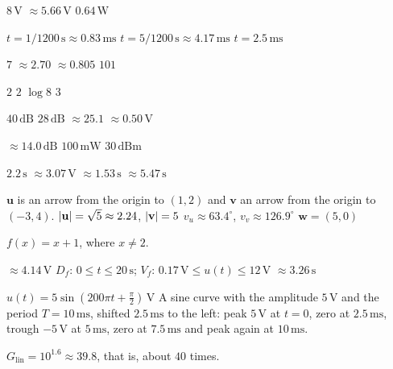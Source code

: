 \begin{facit}
  $8\,\text{V}$  $\approx 5.66\,\text{V}$  $0.64\,\text{W}$

  $t = 1/1200\,\text{s} \approx 0.83\,\text{ms}$
 $t = 5/1200\,\text{s} \approx 4.17\,\text{ms}$  $t = 2.5\,\text{ms}$

  $7$  $\approx 2.70$  $\approx 0.805$  $101$

  $2$  $2$  $\log 8$  $3$

  $40\,\text{dB}$  $28\,\text{dB}$  $\approx 25.1$
 $\approx 0.50\,\text{V}$

  $\approx 14.0\,\text{dB}$  $100\,\text{mW}$  $30\,\text{dBm}$

  $2.2\,\text{s}$  $\approx 3.07\,\text{V}$
 $\approx 1.53\,\text{s}$  $\approx 5.47\,\text{s}$

\end{facit}

\begin{facit}

  $\mathbf{u}$ is an arrow from the origin to $(1, 2)$ and $\mathbf{v}$ an arrow
from the origin to $(-3, 4)$.
 $\lvert\mathbf{u}\rvert = \sqrt{5} \approx 2.24$, $\lvert\mathbf{v}\rvert = 5$
 $v_u \approx 63.4^{\circ}$, $v_v \approx 126.9^{\circ}$
 $\mathbf{w} = (5, 0)$

 $f(x) = x + 1$, where $x \neq 2$.

  $\approx 4.14\,\text{V}$
 $D_f$: $0 \leq t \leq 20\,\text{s}$; $V_f$: $0.17\,\text{V} \leq u(t) \leq 12\,\text{V}$
 $\approx 3.26\,\text{s}$

  $u(t) = 5\sin\left(200\pi t + \frac{\pi}{2}\right)\,\text{V}$
 A sine curve with the amplitude $5\,\text{V}$ and the period $T = 10\,\text{ms}$, shifted
$2.5\,\text{ms}$ to the left: peak $5\,\text{V}$ at $t = 0$, zero at $2.5\,\text{ms}$, trough
$-5\,\text{V}$ at $5\,\text{ms}$, zero at $7.5\,\text{ms}$ and peak again at $10\,\text{ms}$.

 $G_{\text{lin}} = 10^{1.6} \approx 39.8$, that is, about $40$ times.

\end{facit}
